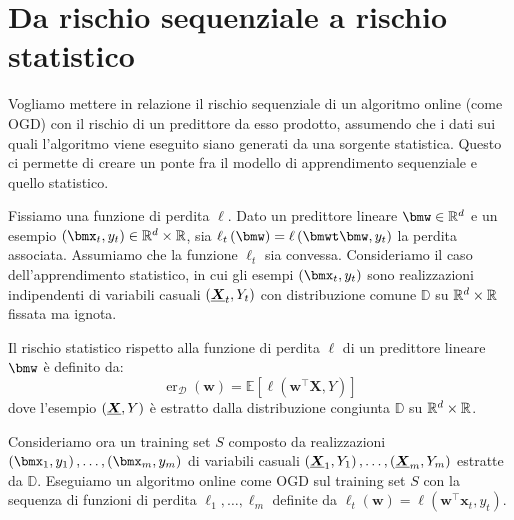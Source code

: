 \documentclass[\main/main.tex]{subfiles}
\begin{document}
\chapter{Da rischio sequenziale a rischio statistico}
\begin{goal}
    Vogliamo mettere in relazione il rischio sequenziale di un algoritmo online (come OGD) con il rischio di un predittore da esso prodotto, assumendo che i dati sui quali l'algoritmo viene eseguito siano generati da una sorgente statistica. Questo ci permette di creare un ponte fra il modello di apprendimento sequenziale e quello statistico.
\end{goal}
\begin{analysis}
    \begin{multicols}{2}
        Fissiamo una funzione di perdita \(\ell\). Dato un predittore lineare \(\bmw \in \R^d\) e un esempio \(\rnd{\bmx_t, y_t} \in \R^d\times\R\), sia \(\ell_t\rnd{\bmw} = \loss{\bmwt\bmw}{y_t}\) la perdita associata. Assumiamo che la funzione \(\ell_t\) sia convessa.
        Consideriamo il caso dell'apprendimento statistico, in cui gli esempi \(\rnd{\bmx_t, y_t}\) sono realizzazioni indipendenti di variabili casuali \(\rnd{\bm{X}_t, Y_t}\) con distribuzione comune \(\mathbb{D}\) su \(\mathbb{R}^d\times\mathbb{R}\) fissata ma ignota.
    
        Il rischio statistico rispetto alla funzione di perdita \(\ell\) di un predittore lineare \(\bmw\) è definito da:
        \[\operatorname{er}_{\mathcal{D}}(\boldsymbol{w})=\mathbb{E}\left[\ell\left(\boldsymbol{w}^{\top} \boldsymbol{X}, Y\right)\right]\]
        dove l'esempio \(\rnd{\bm{X}, Y}\) è estratto dalla distribuzione congiunta \(\mathbb{D}\) su \(\mathbb{R}^d\times \mathbb{R}\).
        
        Consideriamo ora un training set \(S\) composto da realizzazioni \(\examples{m}\) di variabili casuali \(\rnd{\bm{X}_1, Y_1},\ldots,\rnd{\bm{X}_m, Y_m}\) estratte da \(\mathbb{D}\). Eseguiamo un algoritmo online come OGD sul training set \(S\) con la sequenza di funzioni di perdita \(\ell_1, \ldots, \ell_m\) definite da \(\ell_{t}(\boldsymbol{w})=\ell\left(\boldsymbol{w}^{\top} \boldsymbol{x}_{t}, y_{t}\right)\). 
        

\end{multicols}
\end{analysis}
\end{document}
